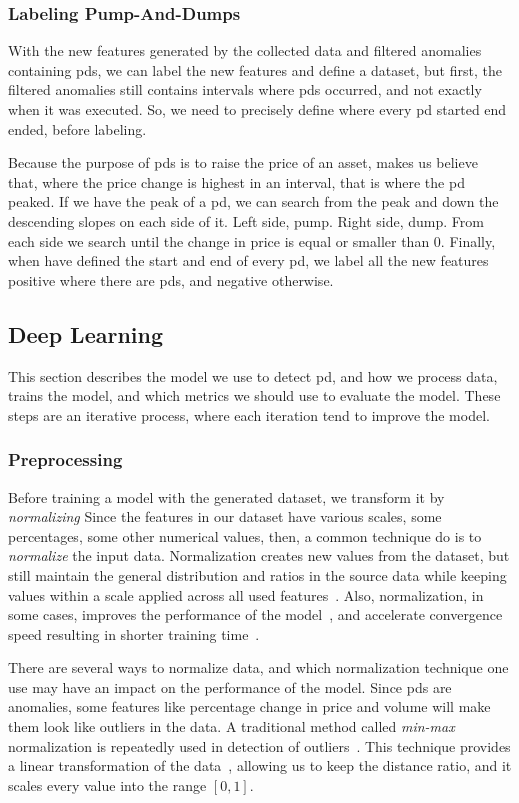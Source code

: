 \subsubsection{Labeling Pump-And-Dumps}
With the new features generated by the collected data and filtered anomalies containing \acp{pd}, we can label the new features and define a dataset, but first, the filtered anomalies still contains intervals where \acp{pd} occurred, and not exactly when it was executed. So, we need to precisely define where every \ac{pd} started end ended, before labeling.

Because the purpose of \acp{pd} is to raise the price of an asset, makes us believe that, where the price change is highest in an interval, that is where the \ac{pd} peaked. If we have the peak of a \ac{pd}, we can search from the peak and down the descending slopes on each side of it. Left side, pump. Right side, dump. From each side we search until the change in price is equal or smaller than $0$. Finally, when have defined the start and end of every \ac{pd}, we label all the new features positive where there are \acp{pd}, and negative otherwise.

\subsection{Deep Learning}
This section describes the model we use to detect \ac{pd}, and how we process data, trains the model, and which metrics we should use to evaluate the model. These steps are an iterative process, where each iteration tend to improve the model.

\subsubsection{Preprocessing}
Before training a model with the generated dataset, we transform it by \emph{normalizing} Since the features in our dataset have various scales, some percentages, some other numerical values, then, a common technique do is to \emph{normalize} the input data. Normalization creates new values from the dataset, but still maintain the general distribution and ratios in the source data while keeping values within a scale applied across all used features~\cite{normalize_data}. Also, normalization, in some cases, improves the performance of the model~\cite{normalize_google}, and accelerate convergence speed resulting in shorter training time~\cite{sola1997importance}.

There are several ways to normalize data, and which normalization technique one use may have an impact on the performance of the model. Since \acp{pd} are anomalies, some features like percentage change in price and volume will make them look like outliers in the data. A traditional method called \emph{min-max} normalization is repeatedly used in detection of outliers~\cite{campos2016evaluation, goldstein2016comparative}. This technique provides a linear transformation of the data~\cite{panda2014smoothing}, allowing us to keep the distance ratio, and it scales every value into the range $[0,1]$.

